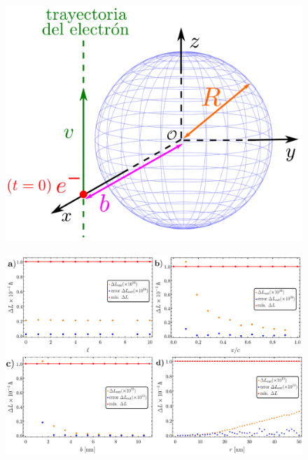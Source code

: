 \label{AppendixAMTextField}

\begin{figure}[h!]
\centering
\includegraphics[width=0.5\linewidth]{17-imagenes/3-AppendixB/system_S.pdf}
\end{figure}

\begin{figure}[h!]
\centering
\includegraphics[width=\linewidth]{17-imagenes/3-AppendixB/Results.pdf}
\end{figure}